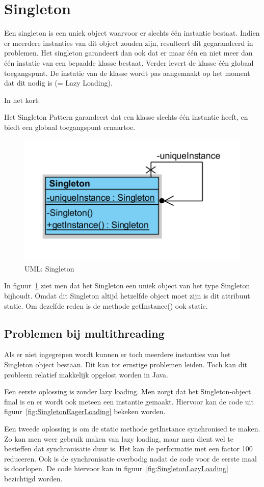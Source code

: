 \documentclass[a4paper,12pt]{article}
\begin{document}
\section{Singleton}
Een singleton is een uniek object waarvoor er slechts één instantie bestaat.
Indien er meerdere instanties van dit object zouden zijn, resulteert dit gegarandeerd in problemen.
Het singleton garandeert dan ook dat er maar één en niet meer dan één instatie van een bepaalde klasse bestaat.
Verder levert de klasse één globaal toegangspunt.
De instatie van de klasse wordt pas aangemaakt op het moment dat dit nodig is (= Lazy Loading).

In het kort:

Het Singleton Pattern garandeert dat een klasse slechts één
instantie heeft, en biedt een globaal toegangspunt ernaartoe.

\begin{figure}[H]
\centering
  	\includegraphics[width=.44\linewidth]{img/Singleton/Singleton.png}
  	\caption{UML: Singleton}
  	\label{fig:Singleton}
\end{figure}

In figuur~\ref{fig:Singleton} ziet men dat het Singleton een uniek object van het type Singleton bijhoudt. Omdat dit Singleton altijd hetzelfde object moet zijn is dit attribuut static. Om dezelfde reden is de methode getInstance() ook static.

\subsection{Problemen bij multithreading}
Als er niet ingegrepen wordt kunnen er toch meerdere instanties van het Singleton object bestaan.
Dit kan tot ernstige problemen leiden.
Toch kan dit probleem relatief makkelijk opgelost worden in Java.

Een eerste oplossing is zonder lazy loading. Men zorgt dat het Singleton-object final is en er wordt ook meteen een instantie gemaakt. Hiervoor kan de code uit figuur~\ref{fig:SingletonEagerLoading} bekeken worden.

Een tweede oplossing is om de static methode getInstance synchronised te maken. Zo kan men weer gebruik maken van lazy loading, maar men dient wel te besteffen dat synchronisatie duur is. Het kan de performatie met een factor 100 reduceren. Ook is de synchronisatie overbodig nadat de code voor de eerste maal is doorlopen. De code hiervoor kan in figuur~\ref{fig:SingletonLazyLoading} bezichtigd worden.
\end{document}
